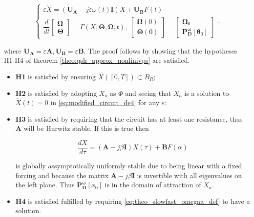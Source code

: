 \begin{equation}\left\{\begin{array}{l} \varepsilon\dot{X} = \left(\mathbf{U_A} - j\varepsilon\omega(t) \mathbf{I}\right) X + \mathbf{U_B} F\left(t\right) \\[3mm] \dfrac{d}{dt}\left[\begin{array}{c} \boldsymbol{\Omega} \\[3mm] \boldsymbol{\Theta}\end{array}\right] = \Gamma \left(X, \boldsymbol{\Theta}, \boldsymbol{\Omega}, t\right),\ \left[\begin{array}{c} \boldsymbol{\Omega}(0) \\[3mm] \boldsymbol{\Theta}(0) \end{array}\right] = \left[\begin{array}{c} \boldsymbol{\Omega}_0 \\[3mm] \mathbf{P_D^\omega}\left[\boldsymbol{\theta}_0\right] \end{array}\right] \end{array}\right. .\label{eq:modified_circuit_de4}\end{equation}

	\noindent where $\mathbf{U_A} = \varepsilon \mathbf{A}, \mathbf{U_B} = \varepsilon \mathbf{B}$. The proof follows by showing that the hypotheses H1-H4 of theorem \ref{theo:qsh_approx_nonlinivps} are satisfied.

\begin{itemize}
	\item \textbf{H1} is satisfied by ensuring $X\left(\left[0,T\right]\right)\subset B_R$;
	\item \textbf{H2} is satisfied by adopting $X_a$ as $\Phi$ and seeing that $X_a$ is a solution to $\dot{X}(t) = 0$ in \eqref{eq:modified_circuit_de4} for any $\varepsilon$;
	\item \textbf{H3} is satisfied by requiring that the circuit has at least one resistance, thus $\mathbf{A}$ will be Hurwitz stable. If this is true then

\begin{equation}\dfrac{dX}{d\tau} = \left(\mathbf{A} - j\beta \mathbf{I}\right)X\left(\tau\right) + \mathbf{B}F\left(\alpha\right)\label{eq:theo_time_complex_final_assymt}\end{equation}

	is globally assymptotically uniformly stable due to being linear with a fixed forcing and because the matrix $\mathbf{A} - j\beta \mathbf{I}$ is invertible with all eigenvalues on the left plane. Thus $\mathbf{P_D^\omega}\left[x_0\right]$ is in the domain of attraction of $X_a$.
	\item \textbf{H4} is satisfied fulfilled by requiring \eqref{eq:theo_slowfast_omegaa_def} to have a solution.
\end{itemize}

